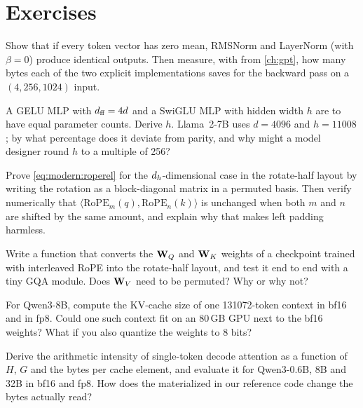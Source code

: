 \section{Exercises}

\begin{exercise}
Show that if every token vector has zero mean, RMSNorm and LayerNorm (with $\beta=0$) produce identical
outputs. Then measure, with  from \cref{ch:gpt}, how many bytes each of the two
explicit implementations saves for the backward pass on a $(4,256,1024)$ input.
\end{exercise}

\begin{exercise}
A GELU MLP with $d_{\text{ff}}=4d$ and a SwiGLU MLP with hidden width $h$ are to have equal parameter counts.
Derive $h$. Llama~2-7B uses $d=4096$ and $h=11008$; by what percentage does it deviate from parity, and
why might a model designer round $h$ to a multiple of 256?
\end{exercise}

\begin{exercise}
Prove \cref{eq:modern:roperel} for the $d_{h}$-dimensional case in the rotate-half layout by writing
the rotation as a block-diagonal matrix in a permuted basis. Then verify numerically that
$\langle\mathrm{RoPE}_m(q),\mathrm{RoPE}_n(k)\rangle$ is unchanged when both $m$ and $n$ are shifted by
the same amount, and explain why that makes left padding harmless.
\end{exercise}

\begin{exercise}
Write a function that converts the $\mathbf{W}_Q$ and $\mathbf{W}_K$ weights of a checkpoint trained with
interleaved RoPE into the rotate-half layout, and test it end to end with a tiny GQA module. Does
$\mathbf{W}_V$ need to be permuted? Why or why not?
\end{exercise}

\begin{exercise}[KV budget]
For Qwen3-8B, compute the KV-cache size of one \num{131072}-token context in bf16 and in fp8. Could one
such context fit on an 80\,GB GPU next to the bf16 weights? What if you also quantize the weights to
8 bits?
\end{exercise}

\begin{exercise}
Derive the arithmetic intensity of single-token decode attention as a function of $H$, $G$ and the bytes
per cache element, and evaluate it for Qwen3-0.6B, 8B and 32B in bf16 and fp8. How does the materialized
 in our reference code change the bytes actually read?
\end{exercise}


